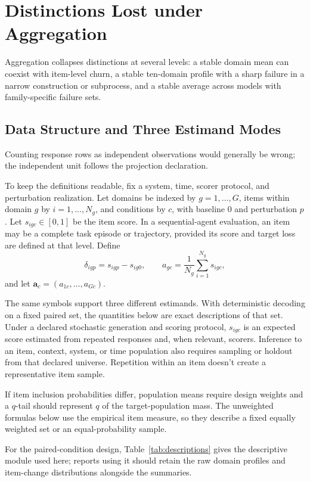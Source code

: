 \documentclass[12pt]{article}
\begin{document}
\section{Distinctions Lost under Aggregation}\label{sec:profile}

Aggregation collapses distinctions at several levels: a stable domain mean can coexist with item-level churn, a stable ten-domain profile with a sharp failure in a narrow construction or subprocess, and a stable average across models with family-specific failure sets.

\subsection{Data Structure and Three Estimand Modes}\label{ssec:setup}

Counting response rows as independent observations would generally be wrong; the independent unit follows the projection declaration.

To keep the definitions readable, fix a system, time, scorer protocol, and perturbation realization. Let domains be indexed by \(g=1,\ldots,G\), items within domain \(g\) by \(i=1,\ldots,N_g\), and conditions by \(c\), with baseline \(0\) and perturbation \(p\). Let \(s_{igc}\in[0,1]\) be the item score. In a sequential-agent evaluation, an item may be a complete task episode or trajectory, provided its score and target loss are defined at that level. Define
\[
\delta_{igp}=s_{igp}-s_{ig0},
\qquad
a_{gc}=\frac{1}{N_g}\sum_{i=1}^{N_g}s_{igc},
\]
and let \(\mathbf a_c=(a_{1c},\ldots,a_{Gc})\).

The same symbols support three different estimands. With deterministic decoding on a fixed paired set, the quantities below are exact descriptions of that set. Under a declared stochastic generation and scoring protocol, \(s_{igc}\) is an expected score estimated from repeated responses and, when relevant, scorers. Inference to an item, context, system, or time population also requires sampling or holdout from that declared universe. Repetition within an item doesn't create a representative item sample.

If item inclusion probabilities differ, population means require design weights and a \(q\)-tail should represent \(q\) of the target-population mass. The unweighted formulas below use the empirical item measure, so they describe a fixed equally weighted set or an equal-probability sample.

For the paired-condition design, Table~\ref{tab:descriptions} gives the descriptive module used here; reports using it should retain the raw domain profiles and item-change distributions alongside the summaries.
\end{document}
